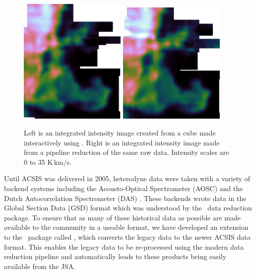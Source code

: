 \documentclass[final,authoryear,5p,times,twocolumn]{elsarticle}
\begin{document}
\begin{figure}[t]
\begin{minipage}{\textwidth}
\centering
\includegraphics[width=0.46\textwidth]{horsehead-specx}
\includegraphics[width=0.46\textwidth]{horsehead-pipeline}
\caption{Left is an integrated intensity image created from
  a cube made interactively using \specx. Right is an
  integrated intensity image made from a pipeline reduction of the
  same raw data. Intensity scales are 0 to 35 K\,km/s.}
\label{fig:hhcmp}
\end{minipage}
\end{figure}

Until ACSIS was delivered in 2005, heterodyne data were taken with a
variety of backend systems including the Acousto-Optical Spectrometer
(AOSC) and the Dutch Autocorrelation Spectrometer (DAS)
\citep{1986SPIE..598..134B}. These backends wrote data in the
Global Section Data (GSD) format \citep[e.g.][]{GSD1999} which was
understood by the \specx\ data reduction package. To ensure that as many
of these historical data as possible are made available to the community
in a useable format, we have developed an extension to the \smurf\
package called \gsdacsis, which converts the legacy data to the
newer ACSIS data format. This enables the legacy data to be re-processed using
the modern data reduction pipeline and automatically leads to these
products being easily available from the JSA.
\end{document}
